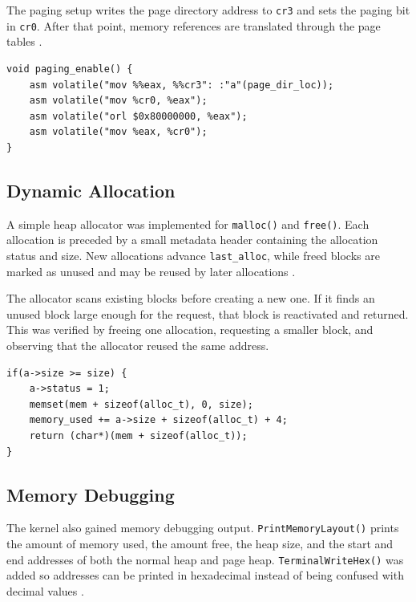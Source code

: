 The paging setup writes the page directory address to \texttt{cr3} and sets the paging bit in \texttt{cr0}. After that point, memory references are translated through the page tables \cite{osdevSettingUpPaging,intelSdm}.

\begin{listing}[H]
\begin{verbatim}
void paging_enable() {
    asm volatile("mov %%eax, %%cr3": :"a"(page_dir_loc));
    asm volatile("mov %cr0, %eax");
    asm volatile("orl $0x80000000, %eax");
    asm volatile("mov %eax, %cr0");
}
\end{verbatim}
\caption{Enabling paging by loading \texttt{cr3} and setting the paging bit in \texttt{cr0}.}
\end{listing}

\subsection{Dynamic Allocation}
A simple heap allocator was implemented for \texttt{malloc()} and \texttt{free()}. Each allocation is preceded by a small metadata header containing the allocation status and size. New allocations advance \texttt{last\_alloc}, while freed blocks are marked as unused and may be reused by later allocations \cite{osdevMemoryAllocation}.

The allocator scans existing blocks before creating a new one. If it finds an unused block large enough for the request, that block is reactivated and returned. This was verified by freeing one allocation, requesting a smaller block, and observing that the allocator reused the same address.

\begin{listing}[H]
\begin{verbatim}
if(a->size >= size) {
    a->status = 1;
    memset(mem + sizeof(alloc_t), 0, size);
    memory_used += a->size + sizeof(alloc_t) + 4;
    return (char*)(mem + sizeof(alloc_t));
}
\end{verbatim}
\caption{Reusing a freed heap block when it is large enough for a new allocation.}
\end{listing}

\subsection{Memory Debugging}
The kernel also gained memory debugging output. \texttt{PrintMemoryLayout()} prints the amount of memory used, the amount free, the heap size, and the start and end addresses of both the normal heap and page heap. \texttt{TerminalWriteHex()} was added so addresses can be printed in hexadecimal instead of being confused with decimal values \cite{assignmentFiles}.
\clearpage

